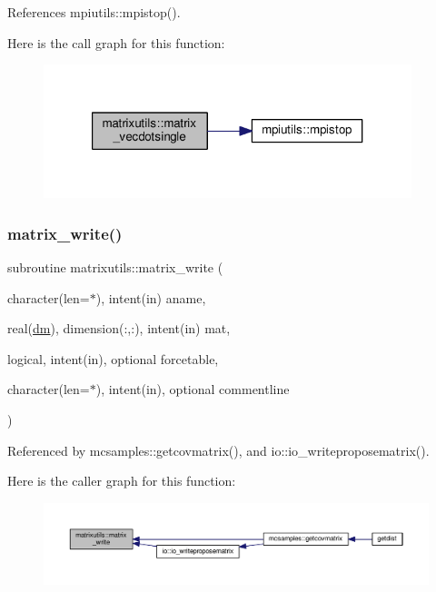 References mpiutils\+::mpistop().

Here is the call graph for this function\+:
\nopagebreak
\begin{figure}[H]
\begin{center}
\leavevmode
\includegraphics[width=304pt]{namespacematrixutils_a7c0b5ddd8a7ff3cd1231b2b56a63aefc_cgraph}
\end{center}
\end{figure}
\mbox{\label{namespacematrixutils_af21f52b4eeb7fc47bb9cd5e35cc1ebc8}} 
\subsubsection{\texorpdfstring{matrix\+\_\+write()}{matrix\_write()}}
{\footnotesize\ttfamily subroutine matrixutils\+::matrix\+\_\+write (\begin{DoxyParamCaption}\item[{character(len=$\ast$), intent(in)}]{aname,  }\item[{real(\mbox{\hyperlink{namespacematrixutils_a7bdc564986ea4d90f51201c75606ef3d}{dm}}), dimension(\+:,\+:), intent(in)}]{mat,  }\item[{logical, intent(in), optional}]{forcetable,  }\item[{character(len=$\ast$), intent(in), optional}]{commentline }\end{DoxyParamCaption})}



Referenced by mcsamples\+::getcovmatrix(), and io\+::io\+\_\+writeproposematrix().

Here is the caller graph for this function\+:
\nopagebreak
\begin{figure}[H]
\begin{center}
\leavevmode
\includegraphics[width=350pt]{namespacematrixutils_af21f52b4eeb7fc47bb9cd5e35cc1ebc8_icgraph}
\end{center}
\end{figure}
\mbox{\label{namespacematrixutils_a5897a3508757971da56e07e3cdab7f0a}} 
